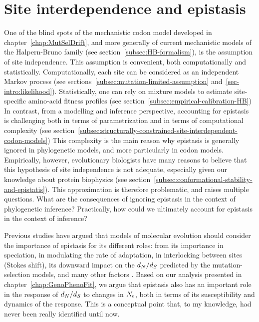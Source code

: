 \section{Site interdependence and epistasis}
\label{sec:epistasis-and-entrenchment}

One of the blind spots of the mechanistic codon model developed in chapter~\ref{chap:MutSelDrift}, and more generally of current mechanistic models of the Halpern-Bruno family (see section~\ref{subsec:HB-formalism}), is the assumption of site independence.
This assumption is convenient, both computationally and statistically.
Computationally, each site can be considered as an independent Markov process (see sections~\ref{subsec:mutation-limited-assumption} and~\ref{sec-intro:likelihood}).
Statistically, one can rely on mixture models to estimate site-specific amino-acid fitness profiles (see section~\ref{subsec:empirical-calibration-HB})
In contrast, from a modelling and inference perspective, accounting for epistasis is challenging both in terms of parametrization and in terms of computational complexity (see section~\ref{subsec:structurally-constrained-site-interdependent-codon-models})
This complexity is the main reason why epistasis is generally ignored in phylogenetic models, and more particularly in codon models.
Empirically, however, evolutionary biologists have many reasons to believe that this hypothesis of site independence is not adequate, especially given our knowledge about protein biophysics (see section~\ref{subsec:conformational-stability-and-epistatis}).
This approximation is therefore problematic, and raises multiple questions.
What are the consequences of ignoring epistasis in the context of phylogenetic inference?
Practically, how could we ultimately account for epistasis in the context of inference?

Previous studies have argued that models of molecular evolution should consider the importance of epistasis for its different roles: from its importance in speciation, in modulating the rate of adaptation, in interlocking between sites (Stokes shift), its downward impact on the $d_N / d_S$ predicted by the mutation-selection models, and many other factors \citet{Goldstein2017, Miller2018}.
Based on our analysis presented in chapter~\ref{chap:GenoPhenoFit}, we argue that epistasis also has an important role in the response of $d_N / d_S$ to changes in $N_{\text{e}}$, both in terms of its susceptibility and dynamics of the response.
This is a conceptual point that, to my knowledge, had never been really identified until now.

